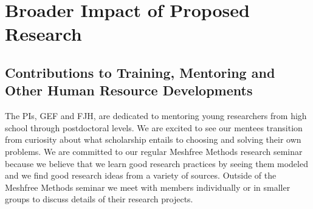 \documentclass[11pt]{NSFamsart}
\begin{document}


\section{Broader Impact of Proposed Research}\label{SectBroad}


\subsection{Contributions to Training, Mentoring and Other Human Resource Developments}

The PIs, GEF and FJH, are dedicated to mentoring young researchers from high school through postdoctoral levels.  We are excited to see our mentees transition from curiosity about what scholarship entails to choosing and solving their own problems.  We are committed to our regular Meshfree Methods research seminar because we believe that we learn good research practices by seeing them modeled and we find good research ideas from a variety of sources. Outside of the Meshfree Methods seminar we meet with members individually or in smaller groups to discuss details of their research projects.
\end{document}

